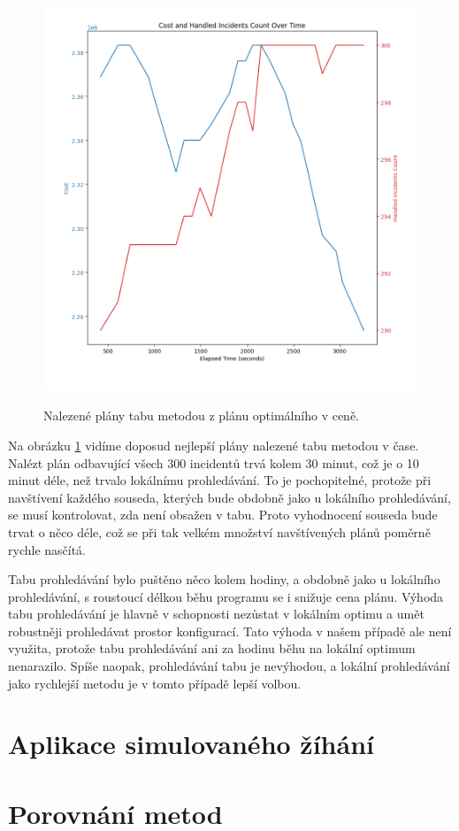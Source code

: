 \begin{figure}[H]
  \caption{Nalezené plány tabu metodou z plánu optimálního v ceně.}
  \includegraphics[width=\textwidth]{img/prague_hybrid_tabu.png}
  \centering
  \label{img:hybrid_tabu}
\end{figure}

Na obrázku \ref{img:hybrid_tabu} vidíme doposud nejlepší plány nalezené tabu metodou v čase.
Nalézt plán odbavující všech 300 incidentů trvá kolem 30 minut, což je o 10 minut déle, než trvalo lokálnímu prohledávání. 
To je pochopitelné, protože při navštívení každého souseda, kterých bude obdobně jako u lokálního prohledávání, se musí kontrolovat,
zda není obsažen v tabu. Proto vyhodnocení souseda bude trvat o něco déle, což se při tak velkém množství navštívených plánů poměrně rychle nasčítá.

Tabu prohledávání bylo puštěno něco kolem hodiny, a obdobně jako u lokálního prohledávání, s roustoucí délkou běhu programu se i snižuje cena plánu.
Výhoda tabu prohledávání je hlavně v schopnosti nezůstat v lokálním optimu a umět robustněji prohledávat prostor konfigurací.
Tato výhoda v našem případě ale není využita, protože tabu prohledávání ani za hodinu běhu na lokální optimum nenarazilo.
Spíše naopak, prohledávání tabu je nevýhodou, a lokální prohledávání jako rychlejší metodu je v tomto případě lepší volbou.


\section{Aplikace simulovaného žíhání}

\section{Porovnání metod}

